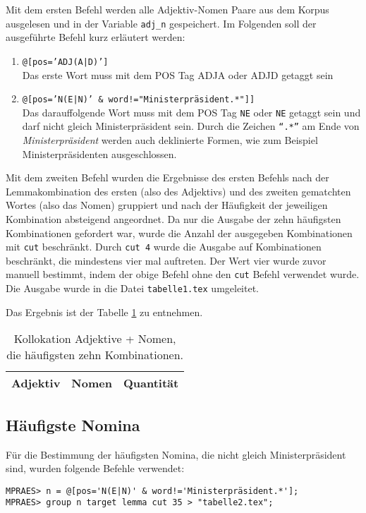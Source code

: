 \documentclass[%
	type=document,%
  	style=article,%
  	media=print,
  	pages=oneside,%
  	prefixLecturer=Dozenten:,
  	author=multiple,
]{unihildesheim} %
\begin{document}
Mit dem ersten Befehl werden alle Adjektiv-Nomen Paare aus dem Korpus ausgelesen
und in der Variable \texttt{adj\_n} gespeichert. Im Folgenden soll der
ausgeführte Befehl kurz erläutert werden:
\begin{enumerate}
  \item \texttt{@[pos='ADJ(A|D)']} \\
			Das erste Wort muss mit dem POS Tag \textsf{ADJA} oder \textsf{ADJD} getaggt
			sein
  \item \texttt{@[pos='N(E|N)' \& word!="Ministerpräsident.*"]]} \\
			Das darauffolgende Wort muss mit dem POS Tag \texttt{NE} oder \texttt{NE}
			getaggt sein und darf nicht gleich Ministerpräsident sein. Durch die Zeichen
			\texttt{"`.*"'} am Ende von \textit{Ministerpräsident} werden auch
			deklinierte Formen, wie zum Beispiel Ministerpräsidenten ausgeschlossen.
\end{enumerate}

Mit dem zweiten Befehl wurden die Ergebnisse des ersten Befehls nach der
Lemmakombination des ersten (also des Adjektivs) und des zweiten gematchten
Wortes (also das Nomen) gruppiert und nach der Häufigkeit der jeweiligen
Kombination absteigend angeordnet. Da nur die Ausgabe der zehn häufigsten
Kombinationen gefordert war, wurde die Anzahl der ausgegeben Kombinationen
mit \texttt{cut} beschränkt. Durch \texttt{cut 4} wurde die Ausgabe auf
Kombinationen beschränkt, die mindestens vier mal auftreten. Der Wert vier wurde zuvor manuell
bestimmt, indem der obige Befehl ohne den \texttt{cut} Befehl verwendet wurde.
Die Ausgabe wurde in die Datei \texttt{tabelle1.tex} umgeleitet.

Das Ergebnis ist der Tabelle \ref{tab:adjektive_nomina} zu entnehmen.

\begin{table}[htpb]\label{t}
	\center
	\begin{tabularx}{0.6\textwidth}{llr}
		\toprule
		\textbf{Adjektiv} & \textbf{Nomen} & \textbf{Quantität}\\
		\midrule
		
		\bottomrule
	\end{tabularx}
	\caption{Kollokation Adjektive + Nomen, die häufigsten zehn Kombinationen.}
	\label{tab:adjektive_nomina}
\end{table}

\subsection{Häufigste Nomina}
Für die Bestimmung der häufigsten Nomina, die nicht gleich Ministerpräsident
sind, wurden folgende Befehle verwendet:
\begin{Verbatim}[frame=single,label=CQP,commandchars=\\\{\}]
MPRAES> n = @[pos='N(E|N)' & word!='Ministerpräsident.*'];
MPRAES> group n target lemma cut 35 > "tabelle2.tex";
\end{Verbatim}
\end{document}

